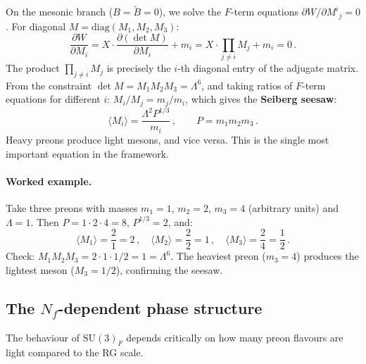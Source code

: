 \documentclass[12pt,a4paper]{article}
\newcommand{\SU}{\mathrm{SU}}
\newcommand{\Nf}{N_{\!f}}
\newcommand{\diag}{\mathrm{diag}}
\begin{document}
On the mesonic branch ($B = \tilde{B} = 0$), we solve the
$F$-term equations $\partial W / \partial M^i{}_j = 0$.
For diagonal $M = \diag(M_1, M_2, M_3)$:
\begin{equation}
  \frac{\partial W}{\partial M_i}
  = X \cdot \frac{\partial(\det M)}{\partial M_i} + m_i
  = X \cdot \prod_{j \neq i} M_j + m_i = 0\,.
  \label{eq:Fterm_M}
\end{equation}
The product $\prod_{j \neq i} M_j$ is precisely the $i$-th
diagonal entry of the adjugate matrix.
From the constraint $\det M = M_1 M_2 M_3 = \Lambda^6$,
and taking ratios of $F$-term equations for different $i$:
$M_i/M_j = m_j/m_i$, which gives the \textbf{Seiberg seesaw}:
\begin{equation}
  \langle M_i \rangle = \frac{\Lambda^2 P^{1/3}}{m_i}\,,
  \qquad P = m_1 m_2 m_3\,.
  \label{eq:vacuum}
\end{equation}
Heavy preons produce light mesons, and vice versa.
This is the single most important equation in the framework.

\paragraph{Worked example.}
Take three preons with masses $m_1 = 1$, $m_2 = 2$, $m_3 = 4$
(arbitrary units) and $\Lambda = 1$.
Then $P = 1 \cdot 2 \cdot 4 = 8$, $P^{1/3} = 2$, and:
\begin{equation}
  \langle M_1 \rangle = \frac{2}{1} = 2\,,\quad
  \langle M_2 \rangle = \frac{2}{2} = 1\,,\quad
  \langle M_3 \rangle = \frac{2}{4} = \frac{1}{2}\,.
\end{equation}
Check: $M_1 M_2 M_3 = 2 \cdot 1 \cdot 1/2 = 1 = \Lambda^6$.
The heaviest preon ($m_3 = 4$) produces the lightest meson
($M_3 = 1/2$), confirming the seesaw.


\subsection{The $\Nf$-dependent phase structure}

The behaviour of $\SU(3)_F$ depends critically on how many preon
flavours are light compared to the RG scale.
\end{document}
